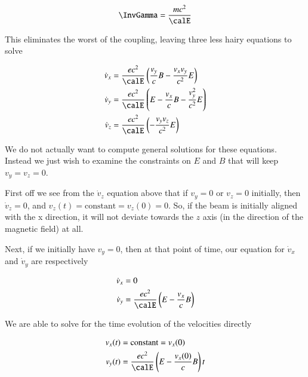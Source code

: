 {\begin{equation}\label{eqn:relElectroDynProblemSet2:330}
\InvGamma = \frac{ m c^2 }{\calE}
\end{equation}

This eliminates the worst of the coupling, leaving three less hairy equations to solve

\begin{equation}\label{eqn:relElectroDynProblemSet2:350}
\begin{aligned}
\dot{v}_x &= \frac{e c^2}{\calE} \left( \frac{v_y}{c} B - \frac{v_x v_y}{c^2} E \right) \\
\dot{v}_y &= \frac{e c^2}{\calE} \left( E - \frac{v_x}{c} B - \frac{v_y^2}{c^2} E \right) \\
\dot{v}_z &= \frac{e c^2}{\calE} \left( - \frac{v_y v_z}{c^2} E \right)
\end{aligned}
\end{equation}

We do not actually want to compute general solutions for these equations.  Instead we just wish to examine the constraints on \(E\) and \(B\) that will keep \(v_y = v_z = 0\).

First off we see from the \(\dot{v}_z\) equation above that if \(v_y = 0\) or \(v_z = 0\) initially, then \(\dot{v}_z = 0\), and \(v_z(t) = \text{constant} = v_z(0) = 0\).  So, if the beam is initially aligned with the x direction, it will not deviate towards the \(z\) axis (in the direction of the magnetic field) at all.

Next, if we initially have \(v_y = 0\), then at that point of time, our equation for \(\dot{v}_x\) and \(\dot{v}_y\) are respectively

\begin{equation}\label{eqn:relElectroDynProblemSet2:370}
\begin{aligned}
\dot{v}_x &= 0 \\
\dot{v}_y &= \frac{e c^2}{\calE} \left( E - \frac{v_x}{c} B \right)
\end{aligned}
\end{equation}

We are able to solve for the time evolution of the velocities directly

\begin{equation}\label{eqn:relElectroDynProblemSet2:390}
\begin{aligned}
v_x(t) &= \text{constant} = v_x(0) \\
v_y(t) &= \frac{e c^2}{\calE} \left( E - \frac{v_x(0)}{c} B \right) t
\end{aligned}
\end{equation}

}
